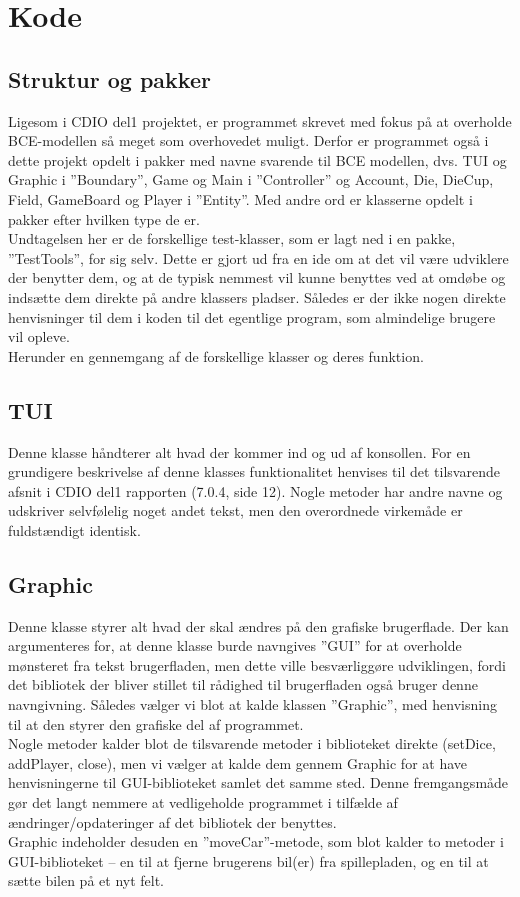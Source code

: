 \section{Kode}
\subsection{Struktur og pakker}
Ligesom i CDIO del1 projektet, er programmet skrevet med fokus på at overholde BCE-modellen så meget som overhovedet muligt. Derfor er programmet også i dette projekt opdelt i pakker med navne svarende til BCE modellen, dvs. TUI og Graphic i ”Boundary”, Game og Main i ”Controller” og Account, Die, DieCup, Field, GameBoard og Player i ”Entity”. Med andre ord er klasserne opdelt i pakker efter hvilken type de er.
\\

Undtagelsen her er de forskellige test-klasser, som er lagt ned i en pakke, ”TestTools”, for sig selv. Dette er gjort ud fra en ide om at det vil være udviklere der benytter dem, og at de typisk nemmest vil kunne benyttes ved at omdøbe og indsætte dem direkte på andre klassers pladser. Således er der ikke nogen direkte henvisninger til dem i koden til det egentlige program, som almindelige brugere vil opleve.
\\


Herunder en gennemgang af de forskellige klasser og deres funktion.
\\
\subsection{TUI}
Denne klasse håndterer alt hvad der kommer ind og ud af konsollen. For en grundigere beskrivelse af denne klasses funktionalitet henvises til det tilsvarende afsnit i CDIO del1 rapporten (7.0.4, side 12).
Nogle metoder har andre navne og udskriver selvfølelig noget andet tekst, men den overordnede virkemåde er fuldstændigt identisk.
\subsection{Graphic}
Denne klasse styrer alt hvad der skal ændres på den grafiske brugerflade. Der kan argumenteres for, at denne klasse burde navngives ”GUI” for at overholde mønsteret fra tekst brugerfladen, men dette ville besværliggøre udviklingen, fordi det bibliotek der bliver stillet til rådighed til brugerfladen også bruger denne navngivning. Således vælger vi blot at kalde klassen ”Graphic”, med henvisning til at den styrer den grafiske del af programmet.
\\
Nogle metoder kalder blot de tilsvarende metoder i biblioteket direkte (setDice, addPlayer, close), men vi vælger at kalde dem gennem Graphic for at have henvisningerne til GUI-biblioteket samlet det samme sted. Denne fremgangsmåde gør det langt nemmere at vedligeholde programmet i tilfælde af ændringer/opdateringer af det bibliotek der benyttes.
\\
Graphic indeholder desuden en ”moveCar”-metode, som blot kalder to metoder i GUI-biblioteket – en til at fjerne brugerens bil(er) fra spillepladen, og en til at sætte bilen på et nyt felt.
\\


